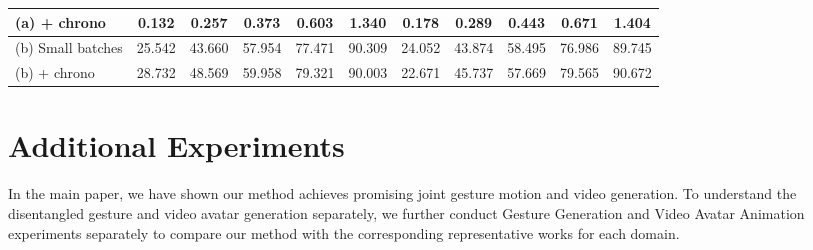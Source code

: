 \begin{table*}
{\begin{tabular}{l|ccccc|ccccc}
        (a) + chrono  &  0.132 &  0.257 & 0.373 &  0.603 &  1.340 &  0.178  & 0.289   &0.443   &0.671   &1.404 \\
        \midrule
    
        (b) Small batches &  25.542  & 43.660  & 57.954  & 77.471   &90.309 & 24.052 & 43.874 & 58.495 & 76.986 & 89.745 \\
        \midrule
        (b) + chrono & 28.732  & 48.569  & 59.958  &79.321 & 90.003 & 22.671 & 45.737 & 57.669 & 79.565 & 90.672 \\
                                      
    \bottomrule        
    \end{tabular}

    }
    \vspace{0.05in}
    
\end{table*}

\section{Additional Experiments}
\label{sec:sub-exp}

In the main paper, we have shown our method achieves promising joint gesture motion and video generation. To understand the disentangled gesture and video avatar generation separately, we further conduct Gesture Generation and Video Avatar Animation experiments separately to compare our method with the corresponding representative works for each domain.





